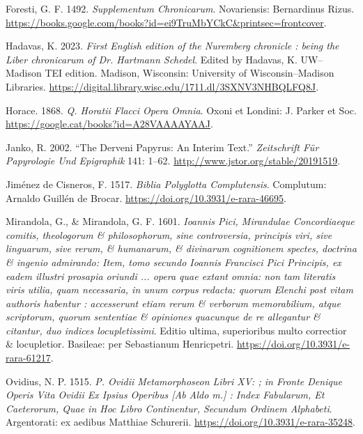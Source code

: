 \documentclass[
]{article}
\newlength{\cslhangindent}
\newlength{\cslentryspacingunit} %
\newenvironment{CSLReferences}[2] %
 {%
  \setlength{\parindent}{0pt}
  \ifodd #1
  \let\oldpar\par
  \def\par{\hangindent=\cslhangindent\oldpar}
  \fi
  \setlength{\parskip}{#2\cslentryspacingunit}
 }%
 {}
\begin{document}
\begin{CSLReferences}{1}{0}
\leavevmode{}%
Foresti, G. F. 1492. \emph{Supplementum Chronicarum}. Novariensis:
Bernardinus Rizus.
\url{https://books.google.com/books?id=ei9TruMbYCkC\&printsec=frontcover}.

\leavevmode{}%
Hadavas, K. 2023. \emph{{First English edition of the Nuremberg
chronicle : being the Liber chronicarum of Dr. Hartmann Schedel}}.
Edited by Hadavas, K. UW--Madison TEI edition. Madison, Wisconsin:
University of Wisconsin--Madison Libraries.
\url{https://digital.library.wisc.edu/1711.dl/3SXNV3NHBQLFQ8J}.

\leavevmode{}%
Horace. 1868. \emph{Q. Horatii Flacci Opera Omnia}. Oxoni et Londini: J.
Parker et Soc. \url{https://google.cat/books?id=A28VAAAAYAAJ}.

\leavevmode{}%
Janko, R. 2002. {``The Derveni Papyrus: An Interim Text.''}
\emph{Zeitschrift Für Papyrologie Und Epigraphik} 141: 1--62.
\url{http://www.jstor.org/stable/20191519}.

\leavevmode{}%
Jiménez de Cisneros, F. 1517. \emph{Biblia Polyglotta Complutensis}.
Complutum: Arnaldo Guillén de Brocar.
\url{https://doi.org/10.3931/e-rara-46695}.

\leavevmode{}%
Mirandola, G., \& Mirandola, G. F. 1601. \emph{{Ioannis Pici, Mirandulae
Concordiaeque comitis, theologorum \& philosophorum, sine controversia,
principis viri, sive linguarum, sive rerum, \& humanarum, \& divinarum
cognitionem spectes, doctrina \& ingenio admirando: Item, tomo secundo
Ioannis Francisci Pici Principis, ex eadem illustri prosapia oriundi ...
opera quae extant omnia: non tam literatis viris utilia, quam
necessaria, in unum corpus redacta: quorum Elenchi post vitam authoris
habentur : accesserunt etiam rerum \& verborum memorabilium, atque
scriptorum, quorum sententiae \& opiniones quacunque de re allegantur \&
citantur, duo indices locupletissimi}}. {Editio ultima, superioribus
multo correctior \& locupletior}. Basileae: per Sebastianum Henricpetri.
\url{https://doi.org/10.3931/e-rara-61217}.

\leavevmode{}%
Ovidius, N. P. 1515. \emph{P. Ovidii Metamorphoseon Libri XV: ; in
Fronte Denique Operis Vita Ovidii Ex Ipsius Operibus {[}Ab Aldo m.{]} :
Index Fabularum, Et Caeterorum, Quae in Hoc Libro Continentur, Secundum
Ordinem Alphabeti}. {Argentorati}: {ex aedibus Matthiae Schurerii}.
\url{https://doi.org/10.3931/e-rara-35248}.


\end{CSLReferences}
\end{document}
